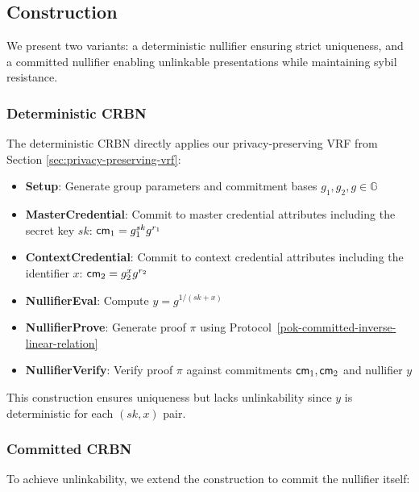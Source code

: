 \subsection{Construction}

We present two variants: a deterministic nullifier ensuring strict uniqueness, and a committed nullifier enabling unlinkable presentations while maintaining sybil resistance.

\subsubsection{Deterministic CRBN}

The deterministic CRBN directly applies our privacy-preserving VRF from Section \ref{sec:privacy-preserving-vrf}:

\begin{itemize}
    \item \textbf{Setup}: Generate group parameters and commitment bases $g_1, g_2, g \in \mathbb{G}$
    \item \textbf{MasterCredential}: Commit to master credential attributes including the secret key $sk$: $\mathsf{cm}_1 = g_1^{sk} g^{r_1}$
    \item \textbf{ContextCredential}: Commit to context credential attributes including the identifier $x$: $\mathsf{cm}_2 = g_2^{x} g^{r_2}$
    \item \textbf{NullifierEval}: Compute $y = g^{1/(sk+x)}$
    \item \textbf{NullifierProve}: Generate proof $\pi$ using Protocol~\ref{pok-committed-inverse-linear-relation}
    \item \textbf{NullifierVerify}: Verify proof $\pi$ against commitments $\mathsf{cm}_1, \mathsf{cm}_2$ and nullifier $y$
\end{itemize}

This construction ensures uniqueness but lacks unlinkability since $y$ is deterministic for each $(sk,x)$ pair.

\subsubsection{Committed CRBN}

To achieve unlinkability, we extend the construction to commit the nullifier itself:

